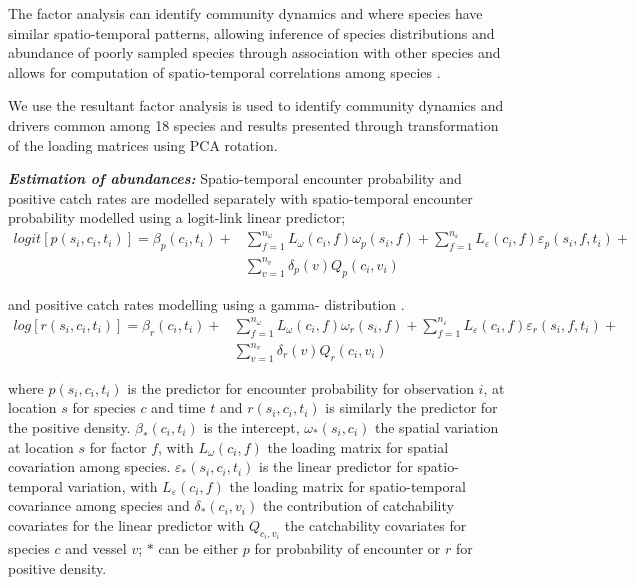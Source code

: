 \documentclass{nature}
\begin{document}
\begin{linenumbers}
The factor analysis can identify community dynamics and where species have
similar spatio-temporal patterns, allowing inference of species distributions
and abundance of poorly sampled species through association with other species
and allows for computation of spatio-temporal correlations among species
\cite{Thorson2016b}.

We use the resultant factor analysis is used to identify
	community dynamics and drivers common among 18 species and results
	presented through transformation of the loading matrices using PCA
	rotation. 

\textbf{\textit{Estimation of abundances:}} Spatio-temporal encounter
probability and positive catch rates are modelled separately with
spatio-temporal encounter probability modelled using a logit-link linear
predictor;
		\begin{equation}
			\begin{split}
			logit[p(s_{i},c_{i},t_{i})] =	\beta_{p}(c_{i},t_{i}) +
			& \sum\limits_{f=1}^{n_{\omega}} L_{\omega}(c_{i},f)
			\omega_{p}(s_{i},f) + \sum\limits_{f=1}^{n_{\varepsilon}}
			L_{\varepsilon}(c_{i},f) \varepsilon_{p}(s_{i},f,t_{i}) + \\ 
			& \sum\limits_{v=1}^{n_{v}}\delta_{p}(v)Q_{p}(c_{i}, v_{i})
		\end{split}
		\end{equation}

and positive catch rates modelling using a gamma- distribution \cite{Thorson2015a}. 
		\begin{equation}
			\begin{split}
			log[r(s_{i},c_{i},t_{i})] = \beta_{r}(c_{i},t_{i}) +
			& \sum\limits_{f=1}^{n_{\omega}} L_{\omega}(c_{i},f)
			\omega_{r}(s_{i},f) +\sum\limits_{f=1}^{n_{\varepsilon}} 
			L_{\varepsilon}(c_{i},f) \varepsilon_{r}(s_{i},f,t_{i}) + \\
			& \sum\limits_{v=1}^{n_{v}}\delta_{r}(v) Q_{r}(c_{i}, v_{i})
			\end{split}
		\end{equation}

where $p(s_{i}, c_{i}, t_{i})$ is the predictor for encounter probability for
observation $i$, at location $s$ for species $c$ and time $t$ and $r(s_{i},
c_{i}, t_{i})$ is similarly the predictor for the positive density.
$\beta_{*}(c_{i},t_{i})$ is the intercept, $\omega_{*}(s_{i},c_{i})$ the
spatial variation at location $s$ for factor $f$, with $L_{\omega}(c_{i},f)$
the loading matrix for spatial covariation among species.
$\varepsilon_{*}(s_{i},c_{i},t_{i})$ is the linear predictor for
spatio-temporal variation, with $L_{\varepsilon}(c_{i}, f)$ the loading matrix
for spatio-temporal covariance among species and $\delta_{*}(c_{i}, v_{i})$ the
contribution of catchability covariates for the linear predictor with
$Q_{c_{i}, v_{i}}$ the catchability covariates for species $c$ and vessel $v$;
$*$ can be either $p$ for probability of encounter or $r$ for positive density.


\end{linenumbers}
\end{document}
